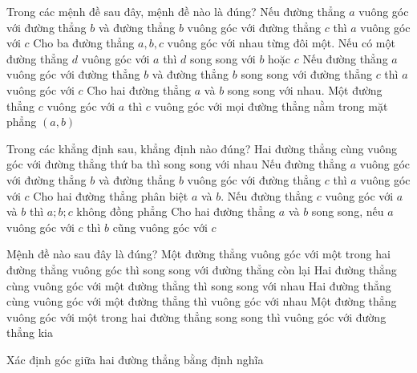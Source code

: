 \begin{ex}
	Trong các mệnh đề sau đây, mệnh đề nào là đúng?
	\choice
	{Nếu đường thẳng $a$ vuông góc với đường thẳng $b$ và đường thẳng $b$ vuông góc với đường thẳng $c$ thì $a$ vuông góc với $c$}
	{Cho ba đường thẳng 
		$a,b,c$ vuông góc với nhau từng đôi một. Nếu có một đường thẳng $d$ vuông góc với $a$ thì $d$ song song với $b$ hoặc $c$}
	{\True Nếu đường thẳng $a$ vuông góc với đường thẳng $b$ và đường thẳng $b$ song song với đường thẳng $c$ thì $a$ vuông góc với $c$}
	{Cho hai đường thẳng $a$ và $b$ song song với nhau. Một đường thẳng $c$ vuông góc với $a$ thì $c$ vuông góc với mọi đường thẳng nằm trong mặt phẳng $(a,b)$}
\end{ex}
\begin{ex}
	Trong các khẳng định sau, khẳng định nào đúng?
	\choice
	{Hai đường thẳng cùng vuông góc với đường thẳng thứ ba thì song song với nhau}
	{Nếu đường thẳng $a$ vuông góc với đường thẳng $b$ và đường thẳng $b$ vuông góc với đường thẳng $c$ thì $a$ vuông góc với $c$}
	{Cho hai đường thẳng phân biệt $a$ và $b$. Nếu đường thẳng $c$ vuông góc với $a$ và $b$ thì $a; b; c$ không đồng phẳng}
	{\True Cho hai đường thẳng $a$ và $b$ song song, nếu $a$ vuông góc với $c$ thì $b$ cũng vuông góc với $c$}
\end{ex}
\begin{ex}
	Mệnh đề nào sau đây là đúng?
	\choice
	{Một đường thẳng vuông góc với một trong hai đường thẳng vuông góc thì song song với đường thẳng còn lại}
	{Hai đường thẳng cùng vuông góc với một đường thẳng thì song song với nhau}
	{Hai đường thẳng cùng vuông góc với một đường thẳng thì vuông góc với nhau}
	{\True Một đường thẳng vuông góc với một trong hai đường thẳng song song thì vuông góc với đường thẳng kia}
\end{ex}
\begin{dang}{Xác định góc giữa hai đường thẳng bằng định nghĩa}
\end{dang}
